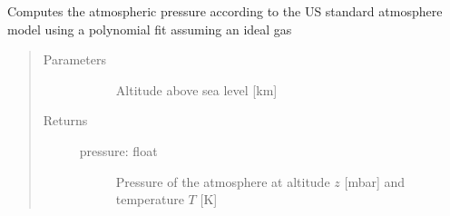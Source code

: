 \documentclass[letterpaper,10pt,english]{sphinxmanual}
\begin{document}

\begin{fulllineitems}
\label{\detokenize{stochprop.eofs:stochprop.eofs.pressure}}
\sphinxAtStartPar
Computes the atmospheric pressure according to the US standard atmosphere model using a polynomial fit assuming an ideal gas
\begin{quote}\begin{description}
\item[{Parameters}] \leavevmode\begin{description}
\item[{}] \leavevmode
\sphinxAtStartPar
Altitude above sea level {[}km{]}

\end{description}

\item[{Returns}] \leavevmode\begin{description}
\item[{pressure: float}] \leavevmode
\sphinxAtStartPar
Pressure of the atmosphere at altitude \(z\) {[}mbar{]} and temperature \(T\) {[}K{]}

\end{description}

\end{description}\end{quote}

\end{fulllineitems}

\end{document}

